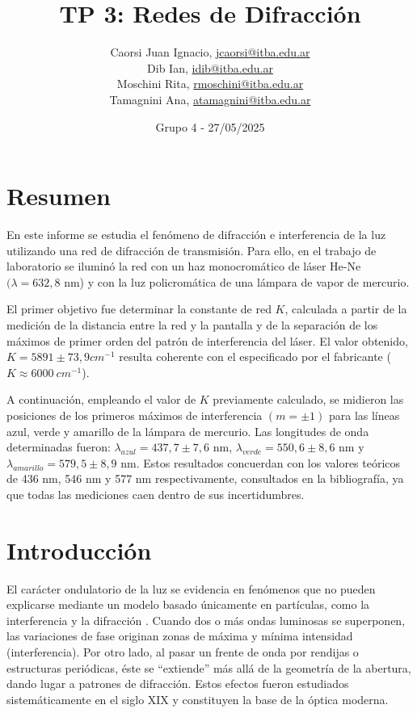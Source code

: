 \documentclass[12pt, a4paper]{article}
\title{TP 3: Redes de Difracción}
\author
{
  Caorsi Juan Ignacio, \href{jcaorsi@itba.edu.ar}{jcaorsi@itba.edu.ar} \\
  Dib Ian, \href{idib@itba.edu.ar}{idib@itba.edu.ar} \\
  Moschini Rita, \href{rmoschini@itba.edu.ar}{rmoschini@itba.edu.ar} \\
  Tamagnini Ana, \href{atamagnini@itba.edu.ar}{atamagnini@itba.edu.ar}
}
\date{Grupo 4 - 27/05/2025}
\begin{document}
\maketitle



\section{Resumen}

En este informe se estudia el fenómeno de difracción e interferencia de la luz utilizando una red de difracción de transmisión. Para ello, 
en el trabajo de laboratorio se iluminó la red con un haz monocromático de láser He-Ne $(\lambda = 632,8$ nm) y con la luz policromática de 
una lámpara de vapor de mercurio.

El primer objetivo fue determinar la constante de red $K$, calculada a partir de la medición de la distancia entre la red y la pantalla y 
de la separación de los máximos de primer orden del patrón de interferencia del láser. El valor obtenido, $K = 5891 \pm 73,9 cm^{-1}$
resulta coherente con el especificado por el fabricante ($K\approx6000\ cm^{-1}$).

A continuación, empleando el valor de $K$ previamente calculado, se midieron las posiciones de los primeros máximos de interferencia 
$(m = \pm 1)$ para las líneas azul, verde y amarillo de la lámpara de mercurio. Las longitudes de onda determinadas fueron:
$\lambda_{azul} = 437,7 \pm 7,6$ nm, $\lambda_{verde} = 550,6 \pm 8,6$ nm y $\lambda_{amarillo} = 579,5 \pm 8,9$ nm. Estos resultados 
concuerdan con los valores teóricos de 436 nm, 546 nm y 577 nm respectivamente, consultados en la bibliografía, ya que todas las 
mediciones caen dentro de sus incertidumbres.


\section{Introducción}

El carácter ondulatorio de la luz se evidencia en fenómenos que no pueden explicarse mediante un modelo basado únicamente en partículas, 
como la interferencia y la difracción \cite{hecht_optics}. Cuando dos o más ondas luminosas se superponen, las variaciones de fase originan zonas de máxima y 
mínima intensidad (interferencia). Por otro lado, al pasar un frente de onda por rendijas o estructuras periódicas, éste se “extiende” más 
allá de la geometría de la abertura, dando lugar a patrones de difracción. Estos efectos fueron estudiados sistemáticamente en el siglo XIX 
y constituyen la base de la óptica moderna.
\end{document}
